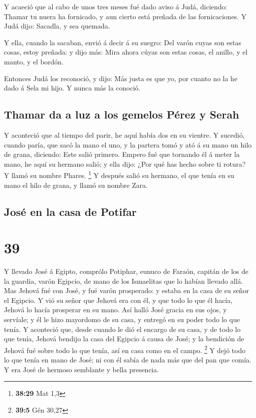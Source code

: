  Y acaeció que al cabo de unos tres meses fué dado aviso á
Judá, diciendo: Thamar tu nuera ha fornicado, y aun cierto está preñada
de las fornicaciones. Y Judá dijo: Sacadla, y sea quemada.

 Y ella, cuando la sacaban, envió á decir á su suegro: Del
varón cuyas son estas cosas, estoy preñada: y dijo más: Mira ahora cúyas
son estas cosas, el anillo, y el manto, y el bordón.

 Entonces Judá los reconoció, y dijo: Más justa es que yo,
por cuanto no la he dado á Sela mi hijo. Y nunca más la conoció.

\hypertarget{thamar-da-a-luz-a-los-gemelos-puxe9rez-y-serah}{%
\subsection{Thamar da a luz a los gemelos Pérez y
Serah}\label{thamar-da-a-luz-a-los-gemelos-puxe9rez-y-serah}}

 Y aconteció que al tiempo del parir, he aquí había dos en
su vientre.  Y sucedió, cuando paría, que sacó la mano el
uno, y la partera tomó y ató á su mano un hilo de grana, diciendo: Este
salió primero.  Empero fué que tornando él á meter la mano,
he aquí su hermano salió; y ella dijo: ¿Por qué has hecho sobre ti
rotura? Y llamó su nombre Phares. \footnote{\textbf{38:29} Mat 1,3}
 Y después salió su hermano, el que tenía en su mano el
hilo de grana, y llamó su nombre Zara.

\hypertarget{josuxe9-en-la-casa-de-potifar}{%
\subsection{José en la casa de
Potifar}\label{josuxe9-en-la-casa-de-potifar}}

\hypertarget{section-38}{%
\section{39}\label{section-38}}

 Y llevado José á Egipto, comprólo Potiphar, eunuco de
Faraón, capitán de los de la guardia, varón Egipcio, de mano de los
Ismaelitas que lo habían llevado allá.  Mas Jehová fué con
José, y fué varón prosperado: y estaba en la casa de su señor el
Egipcio.  Y vió su señor que Jehová era con él, y que todo
lo que él hacía, Jehová lo hacía prosperar en su mano.  Así
halló José gracia en sus ojos, y servíale; y él le hizo mayordomo de su
casa, y entregó en su poder todo lo que tenía.  Y aconteció
que, desde cuando le dió el encargo de su casa, y de todo lo que tenía,
Jehová bendijo la casa del Egipcio á causa de José; y la bendición de
Jehová fué sobre todo lo que tenía, así en casa como en el campo.
\footnote{\textbf{39:5} Gén 30,27}  Y dejó todo lo que tenía
en mano de José; ni con él sabía de nada más que del pan que comía. Y
era José de hermoso semblante y bella presencia.

